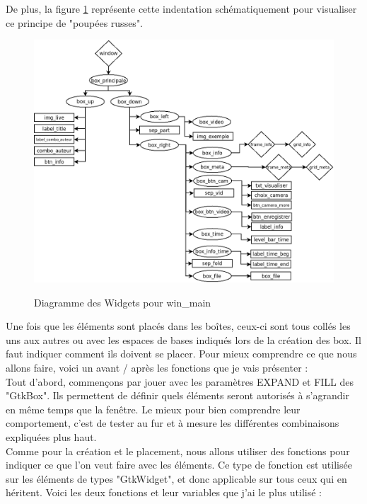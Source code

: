 \documentclass[11pt,french,a4paper]{report}
\begin{document}
De plus, la figure \ref{org_win_main} représente cette indentation schématiquement pour visualiser ce principe de "poupées russes".
\begin{figure}[!h]
\centering
\includegraphics[scale=0.5]{../images/dia/diagramme_fenetre.png} \\
        \caption{Diagramme des Widgets pour win\_main}
        \label{org_win_main}
\end{figure}
Une fois que les éléments sont placés dans les boîtes, ceux-ci sont tous collés les uns aux autres ou avec 
les espaces de bases indiqués lors de la création des box. %
Il faut indiquer comment ils doivent se placer. Pour mieux comprendre ce que nous allons faire, voici un 
avant / après les fonctions que je vais présenter : \\ 


Tout d'abord, commençons par jouer avec les paramètres EXPAND et FILL des "GtkBox". Ils permettent de définir quels éléments seront 
autorisés à s'agrandir en même temps que la fenêtre. Le mieux pour bien comprendre leur comportement, c'est de tester au fur
et à mesure les différentes combinaisons expliquées plus haut. \\

Comme pour la création et le placement, nous allons utiliser des fonctions pour indiquer ce que l'on veut faire avec les éléments.
Ce type de fonction est utilisée sur les éléments de types "GtkWidget", et donc applicable sur tous ceux qui en héritent. Voici les
deux fonctions et leur variables que j'ai le plus utilisé : \\
\end{document}
